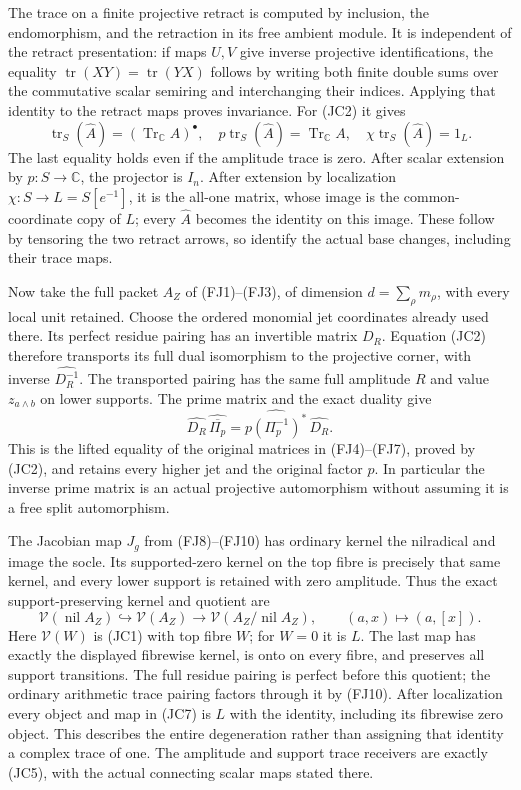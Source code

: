 \documentclass[11pt,a4paper]{article}
\theoremstyle{definition}\newtheorem{definition}[theorem]{Definition}
\begin{document}
The trace on a finite projective retract is computed by inclusion,
the endomorphism, and the retraction in its free ambient module.
It is independent of the retract presentation: if maps $U,V$ give
inverse projective identifications, the equality
$\operatorname{tr}(XY)=\operatorname{tr}(YX)$ follows by writing
both finite double sums over the commutative scalar semiring and
interchanging their indices. Applying that identity to the retract
maps proves invariance. For (JC2) it gives
\[
 \operatorname{tr}_S(\widehat A)
       =(\operatorname{Tr}_{\mathbb C}A)^\bullet,
 \quad
 p\operatorname{tr}_S(\widehat A)=\operatorname{Tr}_{\mathbb C}A,
 \quad
 \chi\operatorname{tr}_S(\widehat A)=1_L.
 \tag{JC5}
\]
The last equality holds even if the amplitude trace is zero.
After scalar extension by $p:S\to\mathbb C$, the projector is
$I_n$. After extension by localization $\chi:S\to L=S[e^{-1}]$,
it is the all-one matrix, whose image is the common-coordinate
copy of $L$; every $\widehat A$ becomes the identity on this image.
These follow by tensoring the two retract arrows, so identify the
actual base changes, including their trace maps.

Now take the full packet $A_Z$ of (FJ1)--(FJ3), of dimension
$d=\sum_\rho m_\rho$, with every local unit retained. Choose the
ordered monomial jet coordinates already used there. Its perfect
residue pairing has an invertible matrix $D_R$. Equation (JC2)
therefore transports its full dual isomorphism to the projective
corner, with inverse $\widehat{D_R^{-1}}$. The transported pairing
has the same full amplitude $R$ and value $z_{a\wedge b}$ on
lower supports. The prime matrix and the exact duality give
\[
 \widehat{D_R}\,\widehat{\overline{\Pi_p}}
  =\widehat{p(\Pi_p^{-1})^*}\,\widehat{D_R}.
 \tag{JC6}
\]
This is the lifted equality of the original matrices in (FJ4)--(FJ7),
proved by (JC2), and retains every higher jet and the original factor
$p$. In particular the inverse prime matrix is an actual projective
automorphism without assuming it is a free split automorphism.

The Jacobian map $J_g$ from (FJ8)--(FJ10) has ordinary kernel the
nilradical and image the socle. Its supported-zero kernel on the
top fibre is precisely that same kernel, and every lower support
is retained with zero amplitude. Thus the exact support-preserving
kernel and quotient are
\[
 \mathcal V(\operatorname{nil}A_Z)\hookrightarrow\mathcal V(A_Z)
 \longrightarrow\mathcal V(A_Z/\operatorname{nil}A_Z),
 \qquad (a,x)\longmapsto(a,[x]).
 \tag{JC7}
\]
Here $\mathcal V(W)$ is (JC1) with top fibre $W$; for $W=0$
it is $L$. The last map has exactly the displayed fibrewise kernel,
is onto on every fibre, and preserves all support transitions.
The full residue pairing is perfect before this quotient; the
ordinary arithmetic trace pairing factors through it by (FJ10).
After localization every object and map in (JC7) is $L$ with the
identity, including its fibrewise zero object. This describes the
entire degeneration rather than assigning that identity a complex
trace of one. The amplitude and support trace receivers are exactly
(JC5), with the actual connecting scalar maps stated there.
\end{document}
